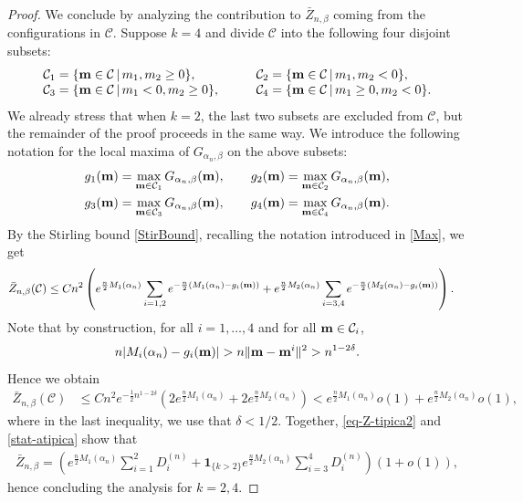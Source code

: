 \documentclass[11pt,oneside]{amsart}
\numberwithin{equation}{section}  %
\theoremstyle{plain}
\theoremstyle{remark}
\def \bm {{\bf m}}
\begin{document}
\begin{proof}
We conclude by analyzing the contribution to $\bar{Z}_{n,\beta}$ coming from the configurations in $\mathcal{C}$. Suppose $k=4$ and divide $\mathcal{C}$ into the following four disjoint subsets:
\begin{equation}\label{4subset}
\begin{array}{ll}
\mathcal{C}_1= \{ \bm \in \mathcal{C} \, | \, m_1,m_2\ge 0\},\qquad& \mathcal{C}_2= \{ \bm \in \mathcal{C} \, | \, m_1,m_2<0\},\\ 
 \mathcal{C}_3= \{ \bm \in \mathcal{C} \, | \, m_1<0,m_2\ge 0\},\qquad& \mathcal{C}_4= \{ \bm \in \mathcal{C} \, | \, m_1\ge 0,m_2<0\}.
\end{array}
\end{equation}
We already stress that when $k=2$, the last two subsets are excluded from $\mathcal{C}$, but the remainder of the proof proceeds in the same way. We introduce the following notation for the local maxima of $G_{\alpha_n,\beta}$ on the above subsets:
\begin{equation*}
\begin{split}
    & g_1(\bm)=\max_{\bm \in \mathcal{C}_1} G_{\alpha_n,\beta}(\bm), 
    \qquad  g_2(\bm)=\max_{\bm \in \mathcal{C}_2}G_{\alpha_n,\beta}(\bm), \\
    & g_3(\bm)=\max_{\bm \in \mathcal{C}_3}G_{\alpha_n,\beta}(\bm), 
    \qquad g_4(\bm)=\max_{\bm \in \mathcal{C}_4}G_{\alpha_n,\beta}(\bm).
\end{split}
\end{equation*}
By the Stirling bound \eqref{StirBound}, recalling the notation introduced in \eqref{Max}, we get
\begin{align*}
    \bar{Z}_{n,\beta}(\mathcal{C}) 
    & \leq C n^2 \left (e^{\frac{n}{2}M_1(\alpha_n)} \sum_{i=1,2} e^{-\frac{n}{2}(M_1(\alpha_n)-g_i(\bm))}
    +e^{\frac{n}{2}M_2(\alpha_n)}\sum_{i=3,4}e^{-\frac{n}{2}(M_2(\alpha_n)-g_i(\bm))}
        \right ).
\end{align*}
Note that by construction, for all $i=1,\ldots, 4$ and for all $\bm \in \mathcal{C}_i$,
\begin{equation*}
n|M_i(\alpha_n)-g_i(\bm)|>n\|\bm-\bm^i\|^2>n^{1-2\delta}.
\end{equation*}
Hence we obtain 
\begin{align}\label{stat-atipica}
\bar{Z}_{n,\beta}(\mathcal{C})& \leq Cn^2e^{-\frac{1}{2}n^{1-2\delta}} (2e^{\frac{n}{2}M_1(\alpha_n)}+2e^{\frac{n}{2}M_2(\alpha_n)})<e^{\frac{n}{2}M_1(\alpha_n)} o(1)+e^{\frac{n}{2}M_2(\alpha_n)} o(1),
\end{align}
where in the last inequality, we use that $\delta<1/2$.
Together, \eqref{eq-Z-tipica2} and \eqref{stat-atipica} show that
\begin{align*}
        \bar{Z}_{n,\beta}=\left (e^{\frac{n}{2} M_1(\alpha_n)} \sum_{i=1}^2 D_i^{(n)}+\textbf{1}_{\{k>2\}}e^{\frac{n}{2}M_2(\alpha_n)} \sum_{i=3}^4 D_i^{(n)} \right ) (1+o(1)),
    \end{align*}
hence concluding the analysis for $k=2,4$.



\end{proof}
\end{document}
